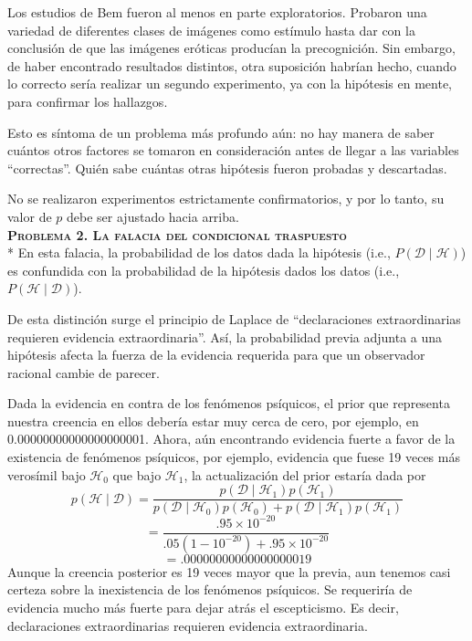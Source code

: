 \documentclass[a4paper,12pt]{article}
\begin{document}
Los estudios de Bem fueron al menos en parte exploratorios. Probaron una variedad de diferentes clases de imágenes como estímulo hasta dar con la conclusión de que las imágenes eróticas producían la precognición. Sin embargo, de haber encontrado resultados distintos, otra suposición habrían hecho, cuando lo correcto sería realizar un segundo experimento, ya con la hipótesis en mente, para confirmar los hallazgos.

Esto es síntoma de un problema más profundo aún: no hay manera de saber cuántos otros factores se tomaron en consideración antes de llegar a las variables ``correctas''. Quién sabe cuántas otras hipótesis fueron probadas y descartadas. 

No se realizaron experimentos estrictamente confirmatorios, y por lo tanto, su valor de $p$ debe ser ajustado hacia arriba.\\

{\scshape\bfseries Problema 2. La falacia del condicional traspuesto}\\*
En esta falacia, la probabilidad de los datos dada la hipótesis (i.e., $P(\mathcal D \mid \mathcal H)$) es confundida con la probabilidad de la hipótesis dados los datos (i.e., $P(\mathcal H \mid \mathcal D)$).

De esta distinción surge el principio de Laplace de ``declaraciones extraordinarias requieren evidencia extraordinaria''. Así, la probabilidad previa adjunta a una hipótesis afecta la fuerza de la evidencia requerida para que un observador racional cambie de parecer.

Dada la evidencia en contra de los fenómenos psíquicos, el prior que representa nuestra creencia en ellos debería estar muy cerca de cero, por ejemplo, en 0.00000000000000000001. Ahora, aún encontrando evidencia fuerte a favor de la existencia de fenómenos psíquicos, por ejemplo, evidencia que fuese 19 veces más verosímil bajo $\mathcal H_0$ que bajo $\mathcal H_1$, la actualización del prior estaría dada por
$$p(\mathcal H \mid \mathcal D) = \frac{p(\mathcal D \mid \mathcal H_1)p(\mathcal H_1)}{p(\mathcal D \mid \mathcal H_0)p(\mathcal H_0)+p(\mathcal D \mid \mathcal H_1)p(\mathcal H_1)}$$
$$=\frac{{.}95\times 10^{-20}}{{.}05(1-10^{-20})+{.}95\times 10^{-20}}$$
$$={.}00000000000000000019$$
Aunque la creencia posterior es 19 veces mayor que la previa, aun tenemos casi certeza sobre la inexistencia de los fenómenos psíquicos. Se requeriría de evidencia mucho más fuerte para dejar atrás el escepticismo. Es decir, declaraciones extraordinarias requieren evidencia extraordinaria. 
\end{document}
